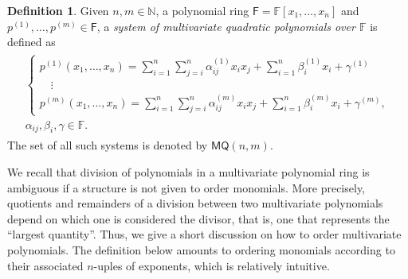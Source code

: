 \documentclass[draft, 12pt, a4paper, oneside]{memoir}
\theoremstyle{definition}
\newtheorem{definition}[theorem]{Definition}
\begin{document}
\begin{definition}
  Given $n, m \in \mathbb{N}$, a polynomial ring $\mathsf{F} = \mathbb{F}[x_{1}, \dots, x_{n}]$ and $p^{(1)}, \dots, p^{(m)} \in \mathsf{F}$, a \emph{system of multivariate quadratic polynomials over $\mathbb{F}$} is defined as
  \begin{align}
    \begin{split}
      \begin{cases}
        p^{(1)}(x_{1}, \dots, x_{n}) = 
          \sum_{i = 1}^{n} \sum_{j = i}^{n} \alpha_{ij}^{(1)} x_{i} x_{j}
            + \sum_{i = 1}^{n} \beta_{i}^{(1)} x_{i} + \gamma^{(1)} \\
        \quad \vdots \\
        p^{(m)}(x_{1}, \dots, x_{n}) = 
          \sum_{i = 1}^{n} \sum_{j = i}^{n} \alpha_{ij}^{(m)} x_{i} x_{j}
            + \sum_{i = 1}^{n} \beta_{i}^{(m)} x_{i} + \gamma^{(m)},
      \end{cases} \\
      \alpha_{ij}, \beta_{i}, \gamma \in \mathbb{F}.
    \end{split}
  \end{align}
  The set of all such systems is denoted by $\mathsf{MQ}(n, m)$.
\end{definition}

We recall that division of polynomials in a multivariate polynomial ring is ambiguous if a structure is not given to order monomials. More precisely, quotients and remainders of a division between two multivariate polynomials depend on which one is considered the divisor, that is, one that represents the ``largest quantity''. Thus, we give a short discussion on how to order multivariate polynomials. The definition below amounts to ordering monomials according to their associated $n$-uples of exponents, which is relatively intuitive. 
\end{document}
